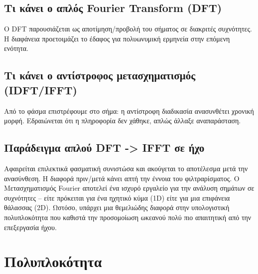 \documentclass[a4paper, 11pt]{article}
\begin{document}
\subsection{Τι κάνει ο απλός Fourier Transform
(DFT)}\label{ux3c4ux3b9-ux3baux3acux3bdux3b5ux3b9-ux3bf-ux3b1ux3c0ux3bbux3ccux3c2-fourier-transform-dft}

Ο DFT παρουσιάζεται ως αποτίμηση/προβολή του σήματος σε διακριτές
συχνότητες. Η διαφάνεια προετοιμάζει το έδαφος για πολυωνυμική ερμηνεία
στην επόμενη ενότητα.

\subsection{Τι κάνει ο αντίστροφος μετασχηματισμός
(IDFT/IFFT)}\label{ux3c4ux3b9-ux3baux3acux3bdux3b5ux3b9-ux3bf-ux3b1ux3bdux3c4ux3afux3c3ux3c4ux3c1ux3bfux3c6ux3bfux3c2-ux3bcux3b5ux3c4ux3b1ux3c3ux3c7ux3b7ux3bcux3b1ux3c4ux3b9ux3c3ux3bcux3ccux3c2-idftifft}

Από το φάσμα επιστρέφουμε στο σήμα: η αντίστροφη διαδικασία ανασυνθέτει
χρονική μορφή. Εδραιώνεται ότι η πληροφορία δεν χάθηκε, απλώς άλλαξε
αναπαράσταση.

\subsection{Παράδειγμα απλού DFT -\textgreater{} IFFT σε
ήχο}\label{ux3c0ux3b1ux3c1ux3acux3b4ux3b5ux3b9ux3b3ux3bcux3b1-ux3b1ux3c0ux3bbux3bfux3cd-dft---ifft-ux3c3ux3b5-ux3aeux3c7ux3bf}

Αφαιρείται επιλεκτικά φασματική συνιστώσα και ακούγεται το αποτέλεσμα
μετά την ανασύνθεση. Η διαφορά πριν/μετά κάνει απτή την έννοια του
φιλτραρίσματος. Ο Μετασχηματισμός Fourier αποτελεί ένα ισχυρό εργαλείο
για την ανάλυση σημάτων σε συχνότητες -- είτε πρόκειται για ένα ηχητικό
κύμα (1D) είτε για μια επιφάνεια θάλασσας (2D). Ωστόσο, υπάρχει μια
θεμελιώδης διαφορά στην υπολογιστική πολυπλοκότητα που καθιστά την
προσομοίωση ωκεανού πολύ πιο απαιτητική από την επεξεργασία ήχου.

\section{Πολυπλοκότητα}\label{ux3c0ux3bfux3bbux3c5ux3c0ux3bbux3bfux3baux3ccux3c4ux3b7ux3c4ux3b1}
\end{document}
